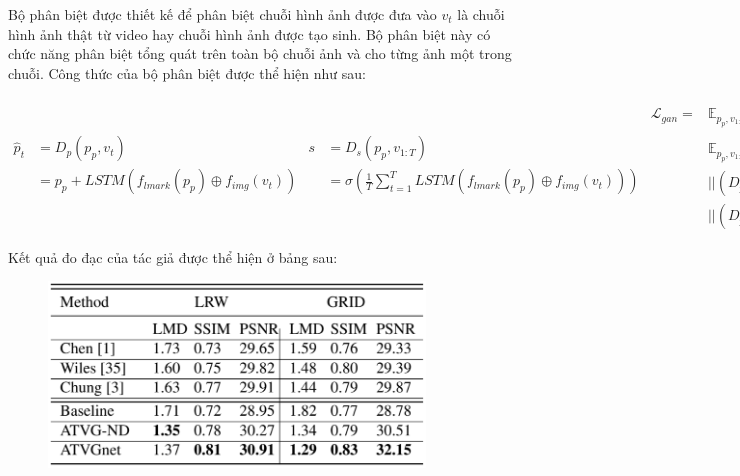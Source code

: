 Bộ phân biệt được thiết kế để phân biệt chuỗi hình ảnh được đưa vào $v_t$ là chuỗi hình ảnh thật từ video hay chuỗi hình ảnh được tạo sinh. Bộ phân biệt này có chức năng phân biệt tổng quát trên toàn bộ chuỗi ảnh và cho từng ảnh một trong chuỗi. Công thức của bộ phân biệt được thể hiện như sau:

\begin{subequations}
    \begin{equation}
        \begin{split}
            \hat{p}_t &= D_p(p_p, v_t) \\
            &= p_p + LSTM(f_{lmark}(p_p) \oplus f_{img}(v_t))
        \end{split}
        \label{eqn:chen2019_dis_dp}
    \end{equation}
    \begin{equation}
        \begin{split}
            s &= D_s(p_p, v_{1:T}) \\
            &= \sigma(\frac{1}{T} \sum^T_{t=1} LSTM(f_{lmark}(p_p) \oplus f_{img}(v_t)))
        \end{split}
        \label{eqn:chen2019_dis_ds}
    \end{equation}
    \begin{equation}
        \begin{split}
        \mathcal{L}_{gan} = &\mathbb{E}_{p_p,v_{1:T}}[logD_s(p_p,v_{1:T})]+\\
        &\mathbb{E}_{p_p,v_{1:T},i_p}[log(1-D_s(p_p,G(p_p,p_{1:T},i_p)))]+\\
        &||(D_p(p_p,G(p_p,p_{1:T},i_p))-p_{1:T}) \odot M_p||^2_2+\\
        &||(D_p(p_p,v_{1:T})-p_{1:T}) \odot M_p||^2_2
        \end{split}
        \label{eqn:chen2019_dis_gan}
    \end{equation}
\end{subequations}

Kết quả đo đạc của tác giả được thể hiện ở bảng sau:
\begin{figure}[H]
    \centering
    \includegraphics[width=10cm]{./content/images/chen2019_result.png}
    \caption{}
    \label{fig:chen2019_result}
\end{figure}

